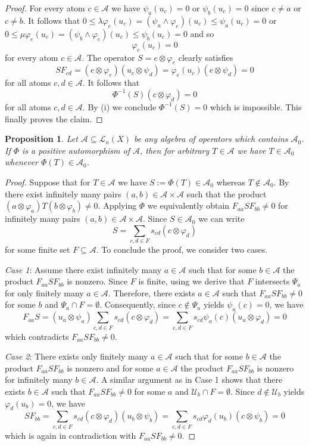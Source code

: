 \documentclass[12pt,reqno]{amsart}
\theoremstyle{plain}
\newtheorem{proposition}[theorem]{Proposition}
\theoremstyle{definition}
\renewcommand{\le}{\leqslant}
\begin{document}
\begin{proof}
For every atom $c\in \mathcal A$ we have $\psi_a(u_c)=0$ or $\psi_b(u_c)=0$ since $c\ne a$ or $c\ne b$. It follows that $0\le\lambda\varphi_e(u_c)=(\psi_a\wedge\varphi_e)(u_c)\le \psi_a(u_c)=0$ or $0\le\mu\varphi_e(u_c)=(\psi_b\wedge\varphi_e)(u_c)\le \psi_b(u_c)=0$ and so
$$\varphi_e(u_c)=0$$
for every atom $c\in \mathcal A$. The operator $S=e\otimes \varphi_e$ clearly satisfies  
$$SF_{cd}=(e\otimes \varphi_e)(u_c\otimes \psi_d)=\varphi_e(u_c)(e\otimes \psi_d)=0$$
for all atoms $c,d\in \mathcal A$. It follows that
$$\Phi^{-1}(S)(c\otimes \varphi_d)=0$$
for all atoms $c,d\in \mathcal A$. By (i) we conclude $\Phi^{-1}(S)=0$ which is impossible. This finally proves the claim.
\end{proof}



\begin{proposition}\label{a0 pride iz a0}
Let $\mathscr A\subseteq \mathscr L_n(X)$ be any algebra of operators which contains $\mathscr A_0$. If $\Phi$ is a positive automorphism of $\mathscr A$, then for arbitrary $T\in \mathscr A$ we have $T\in \mathscr A_0$ whenever $\Phi(T)\in \mathscr A_0$.
\end{proposition}

\begin{proof}
Suppose that for $T\in\mathscr A$ we have $S:=\Phi(T)\in\mathscr A_0$ whereas $T \notin\mathscr A_0$. By  there exist infinitely many pairs $(a,b)\in\mathcal A\times\mathcal A$ such that the product $(a\otimes\varphi_a)T(b\otimes\varphi_b)\ne 0$. Applying $\Phi$ we equivalently obtain 
$F_{aa}SF_{bb}\ne 0$ for infinitely many pairs $(a,b)\in \mathcal A\times \mathcal A$. Since $S\in\mathscr A_0$ we can write
$$S=\sum_{c,d\in F}s_{cd}(c\otimes\varphi_d)$$
for some finite set $F\subseteq \mathcal A$. To conclude the proof, we consider two cases.

\emph{Case 1}: Assume there exist infinitely many $a\in\mathcal A$ such that for some $b\in \mathcal A$ the product $F_{aa}SF_{bb}$ is nonzero. Since $F$ is finite, using  we derive that $F$ intersects $\Psi_a$ for only finitely many $a\in \mathcal A$. Therefore, there exists $a\in\mathcal A$ such that $F_{aa}SF_{bb}\ne 0$ for some $b$ and $\Psi_a\cap F=\emptyset$. Consequently, since $c\notin \Psi_a$ yields $\psi_a(c)=0$, we have
$$F_{aa}S=(u_a\otimes\psi_a)\sum_{c,d\in F}s_{cd}(c\otimes\varphi_d)=\sum_{c,d\in F}s_{cd}\psi_a(c)(u_a\otimes\varphi_d)=0$$
which contradicts $F_{aa}SF_{bb}\neq 0$.

\emph{Case 2}: There exists only finitely many $a\in \mathcal A$ such that for some $b\in \mathcal A$ the product $F_{aa}SF_{bb}$ is nonzero and for some $a\in \mathcal A$ the product $F_{aa}SF_{bb}$ is nonzero for infinitely many $b\in \mathcal A$. A similar argument as in Case 1 shows that there exists $b\in\mathcal A$ such that $F_{aa}SF_{bb}\ne 0$ for some $a$ and $\mathcal U_b\cap F=\emptyset$. Since $d\notin \mathcal U_b$ yields $\varphi_d(u_b)=0$, we have
$$SF_{bb}=\sum_{c,d\in F}s_{cd}(c\otimes\varphi_d)(u_b\otimes\psi_b)=\sum_{c,d\in F}s_{cd}\varphi_d(u_b)(c\otimes\psi_b)=0$$
which is again in contradiction with  $F_{aa}SF_{bb}\ne 0$.
\end{proof}
\end{document}
